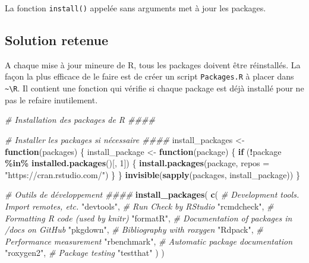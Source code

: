 \documentclass[
  12pt,
  french,
  a4paper,
  extrafontsizes,onecolumn,openright
  ]{memoir}
\newenvironment{Shaded}{\begin{snugshade}}{\end{snugshade}}
\newcommand{\AttributeTok}[1]{\textcolor[rgb]{0.13,0.29,0.53}{#1}}
\newcommand{\CommentTok}[1]{\textcolor[rgb]{0.56,0.35,0.01}{\textit{#1}}}
\newcommand{\ControlFlowTok}[1]{\textcolor[rgb]{0.13,0.29,0.53}{\textbf{#1}}}
\newcommand{\DecValTok}[1]{\textcolor[rgb]{0.00,0.00,0.81}{#1}}
\newcommand{\FunctionTok}[1]{\textcolor[rgb]{0.13,0.29,0.53}{\textbf{#1}}}
\newcommand{\NormalTok}[1]{#1}
\newcommand{\OtherTok}[1]{\textcolor[rgb]{0.56,0.35,0.01}{#1}}
\newcommand{\SpecialCharTok}[1]{\textcolor[rgb]{0.81,0.36,0.00}{\textbf{#1}}}
\newcommand{\StringTok}[1]{\textcolor[rgb]{0.31,0.60,0.02}{#1}}
\newlength{\rf}
\begin{document}
\normalsize

La fonction \texttt{install()} appelée sans arguments met à jour les packages.

\subsection{Solution retenue}\label{solution-retenue}

A chaque mise à jour mineure de R, tous les packages doivent être réinstallés.
La façon la plus efficace de le faire est de créer un script \texttt{Packages.R} à placer dans \texttt{\textasciitilde{}\textbackslash{}R}.
Il contient une fonction qui vérifie si chaque package est déjà installé pour ne pas le refaire inutilement.

\scriptsize

\begin{Shaded}
\begin{Highlighting}[]
\CommentTok{\# Installation des packages de R \#\#\#\#}

\CommentTok{\# Installer les packages si nécessaire \#\#\#\#}
\NormalTok{install\_packages }\OtherTok{\textless{}{-}} \ControlFlowTok{function}\NormalTok{(packages) \{}
\NormalTok{  install\_package }\OtherTok{\textless{}{-}} \ControlFlowTok{function}\NormalTok{(package) \{}
    \ControlFlowTok{if}\NormalTok{ (}\SpecialCharTok{!}\NormalTok{package }\SpecialCharTok{\%in\%} \FunctionTok{installed.packages}\NormalTok{()[, }\DecValTok{1}\NormalTok{]) \{}
      \FunctionTok{install.packages}\NormalTok{(package, }\AttributeTok{repos =} \StringTok{"https://cran.rstudio.com/"}\NormalTok{)}
\NormalTok{    \}}
\NormalTok{  \}}
  \FunctionTok{invisible}\NormalTok{(}\FunctionTok{sapply}\NormalTok{(packages, install\_package))}
\NormalTok{\}}

\CommentTok{\# Outils de développement \#\#\#\#}
\FunctionTok{install\_packages}\NormalTok{(}
  \FunctionTok{c}\NormalTok{(}
    \CommentTok{\# Development tools. Import remotes, etc.}
    \StringTok{"devtools"}\NormalTok{,}
    \CommentTok{\# Run Check by RStudio}
    \StringTok{"rcmdcheck"}\NormalTok{,}
    \CommentTok{\# Formatting R code (used by knitr)}
    \StringTok{"formatR"}\NormalTok{,}
    \CommentTok{\# Documentation of packages in /docs on GitHub}
    \StringTok{"pkgdown"}\NormalTok{,}
    \CommentTok{\# Bibliography with roxygen}
    \StringTok{"Rdpack"}\NormalTok{,}
    \CommentTok{\# Performance measurement}
    \StringTok{"rbenchmark"}\NormalTok{,}
    \CommentTok{\# Automatic package documentation}
    \StringTok{"roxygen2"}\NormalTok{,}
    \CommentTok{\# Package testing}
    \StringTok{"testthat"}
\NormalTok{  )}
\NormalTok{)}


\end{Highlighting}
\end{Shaded}
\end{document}
